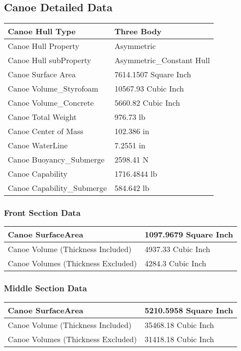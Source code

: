 \documentclass{article}%
\begin{document}
\subsection{Canoe Detailed Data}%
\label{subsec:CanoeDetailedData}%
\begin{tabular}{|l|l|}%
\hline%
Canoe Hull Type&Three Body \\%
\hline%
Canoe Hull Property&Asymmetric \\%
\hline%
Canoe Hull subProperty&Asymmetric\_Constant Hull \\%
\hline%
Canoe Surface Area&7614.1507 Square Inch\\%
\hline%
Canoe Volume\_Styrofoam&10567.93 Cubic Inch\\%
\hline%
Canoe Volume\_Concrete&5660.82 Cubic Inch\\%
\hline%
Canoe Total Weight&976.73 lb\\%
\hline%
Canoe Center of Mass&102.386 in\\%
\hline%
Canoe WaterLine&7.2551 in\\%
\hline%
Canoe Buoyancy\_Submerge&2598.41 N\\%
\hline%
Canoe Capability&1716.4844 lb\\%
\hline%
Canoe Capability\_Submerge&584.642 lb\\%
\hline%
\end{tabular}%
\subsubsection{Front Section Data}%
\label{ssubsec:FrontSectionData}%
\begin{tabular}{|l|l|}%
\hline%
Canoe SurfaceArea&1097.9679 Square Inch\\%
\hline%
Canoe Volume (Thickness Included)&4937.33 Cubic Inch\\%
\hline%
Canoe Volumes (Thickness Excluded)&4284.3 Cubic Inch\\%
\hline%
\end{tabular}

%
\subsubsection{Middle Section Data}%
\label{ssubsec:MiddleSectionData}%
\begin{tabular}{|l|l|}%
\hline%
Canoe SurfaceArea&5210.5958 Square Inch\\%
\hline%
Canoe Volume (Thickness Included)&35468.18 Cubic Inch\\%
\hline%
Canoe Volumes (Thickness Excluded)&31418.18 Cubic Inch\\%
\hline%
\end{tabular}
\end{document}
